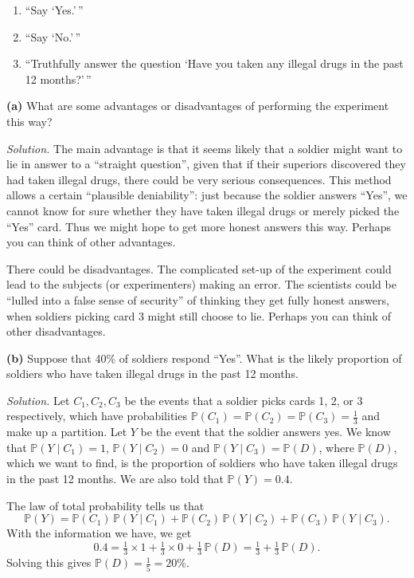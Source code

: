 \documentclass[
  a4paper,
]{book}
\providecommand{\tightlist}{%
  \setlength{\itemsep}{0pt}\setlength{\parskip}{0pt}}
\theoremstyle{definition}
\theoremstyle{definition}
\theoremstyle{definition}
\theoremstyle{definition}
\theoremstyle{remark}
\begin{document}
\begin{enumerate}
\def\labelenumi{\arabic{enumi}.}
\tightlist
\item
  ``Say `Yes.'\,''
\item
  ``Say `No.'\,''
\item
  ``Truthfully answer the question `Have you taken any illegal drugs in the past 12 months?'\,''
\end{enumerate}

\textbf{(a)} What are some advantages or disadvantages of performing the experiment this way?

\begin{myanswers}
\emph{Solution.} The main advantage is that it seems likely that a soldier might want to lie in answer to a ``straight question'', given that if their superiors discovered they had taken illegal drugs, there could be very serious consequences. This method allows a certain ``plausible deniability'': just because the soldier answers ``Yes'', we cannot know for sure whether they have taken illegal drugs or merely picked the ``Yes'' card. Thus we might hope to get more honest answers this way. Perhaps you can think of other advantages.

There could be disadvantages. The complicated set-up of the experiment could lead to the subjects (or experimenters) making an error. The scientists could be ``lulled into a false sense of security'' of thinking they get fully honest answers, when soldiers picking card 3 might still choose to lie. Perhaps you can think of other disadvantages.

\end{myanswers}

\textbf{(b)} Suppose that 40\% of soldiers respond ``Yes''. What is the likely proportion of soldiers who have taken illegal drugs in the past 12 months.

\begin{myanswers}
\emph{Solution.}
Let \(C_1, C_2, C_3\) be the events that a soldier picks cards 1, 2, or 3 respectively, which have probabilities \(\mathbb P(C_1) = \mathbb P(C_2) = \mathbb P(C_3) = \frac13\) and make up a partition. Let \(Y\) be the event that the soldier answers yes. We know that \(\mathbb P(Y \mid C_1) = 1\), \(\mathbb P(Y \mid C_2) = 0\) and \(\mathbb P(Y \mid C_3) = \mathbb P(D)\), where \(\mathbb P(D)\), which we want to find, is the proportion of soldiers who have taken illegal drugs in the past 12 months. We are also told that \(\mathbb P(Y) = 0.4\).

The law of total probability tells us that
\[ \mathbb P(Y) = \mathbb P(C_1)\,\mathbb P(Y \mid C_1) + \mathbb P(C_2)\,\mathbb P(Y \mid C_2) + 
\mathbb P(C_3)\,\mathbb P(Y \mid C_3) .\]
With the information we have, we get
\[ 0.4 = \tfrac13 \times 1 + \tfrac13 \times 0 + \tfrac13 \, \mathbb P(D) = \tfrac13 + \tfrac13 \,\mathbb P(D) . \]
Solving this gives \(\mathbb P(D) = \frac15 = 20\%\).

\end{myanswers}
\end{document}
